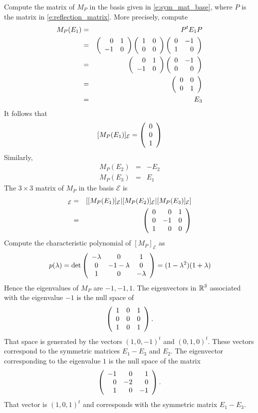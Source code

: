 \documentclass{ximera}
\begin{document}
\begin{exercise}
\begin{solution}
\begin{enumeratea}
\item Compute the matrix of $M_P$ in the basis given in \eqref{e:sym_mat_base}, where $P$ is the matrix in \eqref{e:reflection_matrix}.   More precisely, compute
\begin{eqnarray*}
M_P(E_1) & = & P^t E_1P \\
 & = &    \left(\begin{array}{rrrrrrrrrrrrrrrrrr} 0 & 1 \\ -1 & 0  \end{array}\right) \left(\begin{array}{cccccccccccc} 1 & 0 \\ 0 & 0 \end{array}\right)   \left(\begin{array}{rrrrrrrrrrrrrrrrrr} 0 & -1 \\ 1 & 0  \end{array}\right) \\
 & = &    \left(\begin{array}{rrrrrrrrrrrrrrrrrr} 0 & 1 \\ -1 & 0  \end{array}\right)  \left(\begin{array}{rrrrrrrrrrrrrrrrrr} 0 & -1 \\ 0 & 0  \end{array}\right) \\
 & = & \left(\begin{array}{cccccccccccc} 0 & 0 \\ 0 & 1  \end{array}\right) \\
 & = & E_3
\end{eqnarray*}
It follows that 
\[
[M_P(E_1)]_\mathcal{E} = \left(\begin{array}{cccccccccccc}  0 \\ 0 \\ 1 \end{array}\right)
\]
Similarly,
\begin{eqnarray*}
M_P(E_2) & = & -E_2\\
M_P(E_3) & = & E_1
\end{eqnarray*}
The $3\times 3$ matrix of $M_P$ in the basis $\mathcal{E}$ is 
\begin{eqnarray*}
[M_P]_\mathcal{E} & = & [ [M_P(E_1)]_\mathcal{E} | [M_P(E_2)]_\mathcal{E} |[M_P(E_3)]_\mathcal{E} ] \\
& = &  \Matrix{  0 &  0 & 1 \\  0 & -1 & 0 \\  1 & 0 & 0 }
\end{eqnarray*}
Compute the characteristic polynomial of $[M_P]_\mathcal{E}$ as
\[
p(\lambda)  = \det \left(\begin{array}{cccccccccccc}   -\lambda & 0 &  1 \\ 0 & -1-\lambda & 0 \\ 1 &  0 & -\lambda \end{array}\right) = (1-\lambda^2)(1+\lambda)
\]
Hence the eigenvalues of $M_P$ are $-1,-1,1$. 
The eigenvectors in $\mbox{$\mathbb{R}$}^3$ associated with the eigenvalue $-1$ is the null space of 
\[
\left(\begin{array}{rrrrrrrrrrrrrrrrrr}   1 & 0 &  1 \\ 0 & 0 & 0 \\ 1 &  0 & 1 \end{array}\right) . 
\]
That space is generated by the vectors $(1,0,-1)^t$ and $(0, 1, 0)^t$.   These vectors correspond to the symmetric matrices $E_1-E_3$ and $E_2$.
The eigenvector corresponding to the eigenvalue $1$ is the null space of the matrix 
\[
\left(\begin{array}{rrrrrrrrrrrrrrrrrr}   -1 & 0 &  1 \\ 0 & -2 & 0 \\ 1 &  0 & -1 \end{array}\right) . 
\]
That vector is $(1, 0, 1)^t$ and corresponds with the symmetric matrix $E_1-E_3$.
\end{enumeratea}

\end{solution}
\end{exercise}
\end{document}
